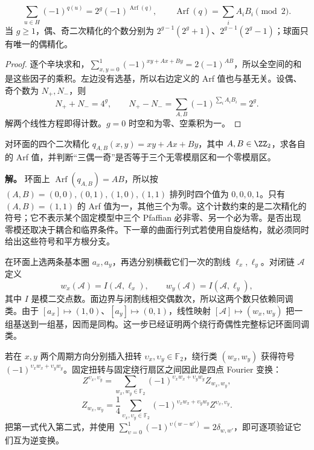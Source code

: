 \begin{theorem}
\begin{equation}
 \sum_{u\in H}(-1)^{q(u)}=2^g(-1)^{\operatorname{Arf}(q)},
 \qquad \operatorname{Arf}(q)=\sum_i A_iB_i\pmod2.
 \label{eq:phys-sm-arf-gauss-sum}
\end{equation}
当 $g\ge1$，偶、奇二次精化的个数分别为 $2^{g-1}(2^g+1)$、$2^{g-1}(2^g-1)$；球面只有唯一的偶精化。
\end{theorem}
\begin{proof}
逐个辛块求和，$\sum_{x,y=0}^1(-1)^{xy+Ax+By}=2(-1)^{AB}$，所以全空间的和是这些因子的乘积。左边没有选基，所以右边定义的 Arf 值也与基无关。设偶、奇个数为 $N_+,N_-$，则
\[
 N_++N_-=4^g,\qquad
 N_+-N_-=\sum_{A,B}(-1)^{\sum_iA_iB_i}=2^g.
\]
解两个线性方程即得计数。$g=0$ 时空和为零、空乘积为一。
\end{proof}

\begin{workedexample}[环面上三偶一奇的精确含义]
对环面的四个二次精化 $q_{A,B}(x,y)=xy+Ax+By$，其中 $A,B\in\ZZ_2$，求各自的 Arf 值，并判断“三偶一奇”是否等于三个无零模扇区和一个零模扇区。

\textbf{解。} 环面上 $\operatorname{Arf}(q_{A,B})=AB$，所以按 $(A,B)=(0,0),(0,1),(1,0),(1,1)$ 排列时四个值为 $0,0,0,1$。只有 $(A,B)=(1,1)$ 的 Arf 值为一，其他三个为零。这个计数约束的是二次精化的符号；它不表示某个固定模型中三个 Pfaffian 必非零、另一个必为零。是否出现零模还取决于耦合和临界条件。下一章的曲面行列式若使用自旋结构，就必须同时给出这些符号和平方根分支。
\end{workedexample}

在环面上选两条基本圈 \(a_x,a_y\)，再选分别横截它们一次的割线
\(\ell_x,\ell_y\)。对闭链 \(\mathscr A\) 定义
\begin{equation}
w_x(\mathscr A)=I(\mathscr A,\ell_x),
\qquad
w_y(\mathscr A)=I(\mathscr A,\ell_y),
\label{eq:phys-sm-winding-parities}
\end{equation}
其中 \(I\) 是模二交点数。面边界与闭割线相交偶数次，所以这两个数只依赖同调类。由于
\([a_x]\mapsto(1,0)\)、\([a_y]\mapsto(0,1)\)，线性映射
\([\mathscr A]\mapsto(w_x,w_y)\) 把一组基送到一组基，因而是同构。这一步已经证明两个绕行奇偶性完整标记环面同调类。

若在 \(x,y\) 两个周期方向分别插入扭转
\(\upsilon_x,\upsilon_y\in\mathbb F_2\)，绕行类
\((w_x,w_y)\) 获得符号
\((-1)^{\upsilon_xw_x+\upsilon_yw_y}\)。固定扭转与固定绕行扇区之间因此是四点 Fourier 变换：
\begin{equation}
Z^{\upsilon_x,\upsilon_y}
=\sum_{w_x,w_y\in\mathbb F_2}
(-1)^{\upsilon_xw_x+\upsilon_yw_y}Z_{w_x,w_y},
\label{eq:phys-sm-torus-character-transform}
\end{equation}
\begin{equation}
Z_{w_x,w_y}
=\frac14\sum_{\upsilon_x,\upsilon_y\in\mathbb F_2}
(-1)^{\upsilon_xw_x+\upsilon_yw_y}Z^{\upsilon_x,\upsilon_y}.
\label{eq:phys-sm-torus-character-inverse}
\end{equation}
把第一式代入第二式，并使用
\(\sum_{\upsilon=0}^1(-1)^{\upsilon(w-w')}=2\delta_{w,w'}\)，即可逐项验证它们互为逆变换。

